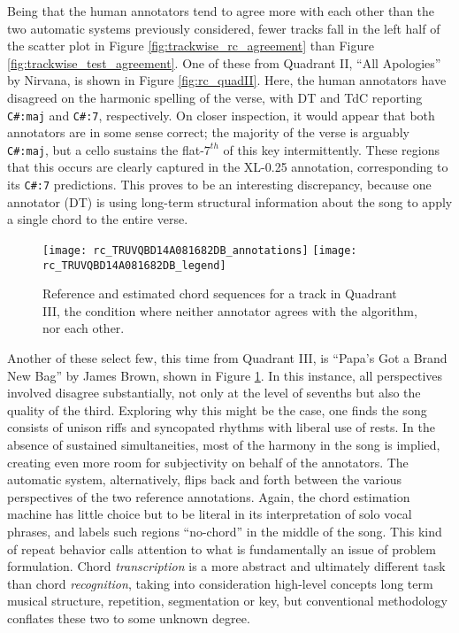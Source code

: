 Being that the human annotators tend to agree more with each other than the two automatic systems previously considered, fewer tracks fall in the left half of the scatter plot in Figure \ref{fig:trackwise_rc_agreement} than Figure \ref{fig:trackwise_test_agreement}.
One of these from Quadrant II, ``All Apologies'' by Nirvana, is shown in Figure \ref{fig:rc_quadII}.
Here, the human annotators have disagreed on the harmonic spelling of the verse, with DT and TdC reporting \texttt{C\#:maj} and \texttt{C\#:7}, respectively.
On closer inspection, it would appear that both annotators are in some sense correct;
the majority of the verse is arguably \texttt{C\#:maj}, but a cello sustains the flat-$7^{th}$ of this key intermittently.
These regions that this occurs are clearly captured in the XL-0.25 annotation, corresponding to its \texttt{C\#:7} predictions.
This proves to be an interesting discrepancy, because one annotator (DT) is using long-term structural information about the song to apply a single chord to the entire verse.

\begin{figure}[t!]
\centering
\texttt{[image: rc\_TRUVQBD14A081682DB\_annotations]}
\texttt{[image: rc\_TRUVQBD14A081682DB\_legend]}
\caption{Reference and estimated chord sequences for a track in Quadrant III, the condition where neither annotator agrees with the algorithm, nor each other.}
\label{fig:rc_quadIII}
\end{figure}

Another of these select few, this time from Quadrant III, is ``Papa's Got a Brand New Bag'' by James Brown, shown in Figure \ref{fig:rc_quadIII}.
In this instance, all perspectives involved disagree substantially, not only at the level of sevenths but also the quality of the third.
Exploring why this might be the case, one finds the song consists of unison riffs and syncopated rhythms with liberal use of rests.
In the absence of sustained simultaneities, most of the harmony in the song is implied, creating even more room for subjectivity on behalf of the annotators.
The automatic system, alternatively, flips back and forth between the various perspectives of the two reference annotations.
Again, the chord estimation machine has little choice but to be literal in its interpretation of solo vocal phrases, and labels such regions ``no-chord'' in the middle of the song.
This kind of repeat behavior calls attention to what is fundamentally an issue of problem formulation.
Chord \emph{transcription} is a more abstract and ultimately different task than chord \emph{recognition}, taking into consideration high-level concepts long term musical structure, repetition, segmentation or key, but conventional methodology conflates these two to some unknown degree.



